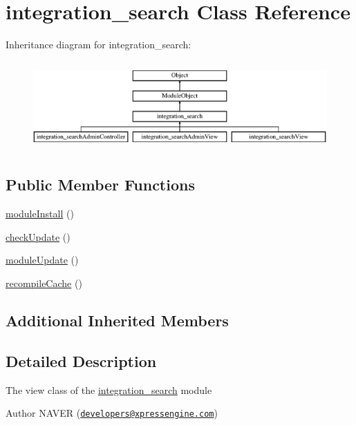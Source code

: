 \hypertarget{classintegration__search}{\section{integration\+\_\+search Class Reference}
\label{classintegration__search}
}
Inheritance diagram for integration\+\_\+search\+:\begin{figure}[H]
\begin{center}
\leavevmode
\includegraphics[height=3.456790cm]{classintegration__search}
\end{center}
\end{figure}
\subsection*{Public Member Functions}
\begin{DoxyCompactItemize}
\item 
\hyperlink{classintegration__search_a04d168bf88a4f95b6f4bd24854538d87}{module\+Install} ()
\item 
\hyperlink{classintegration__search_a998b55202e7ea75389e2ab8f640b374d}{check\+Update} ()
\item 
\hyperlink{classintegration__search_a4a0b59c788e9240fada3131b35ef273c}{module\+Update} ()
\item 
\hyperlink{classintegration__search_aaa47663580bb0ec22cf7b419ad47f2af}{recompile\+Cache} ()
\end{DoxyCompactItemize}
\subsection*{Additional Inherited Members}


\subsection{Detailed Description}
The view class of the \hyperlink{classintegration__search}{integration\+\_\+search} module

\begin{DoxyAuthor}{Author}
N\+A\+V\+E\+R (\href{mailto:developers@xpressengine.com}{\tt developers@xpressengine.\+com}) 
\end{DoxyAuthor}


